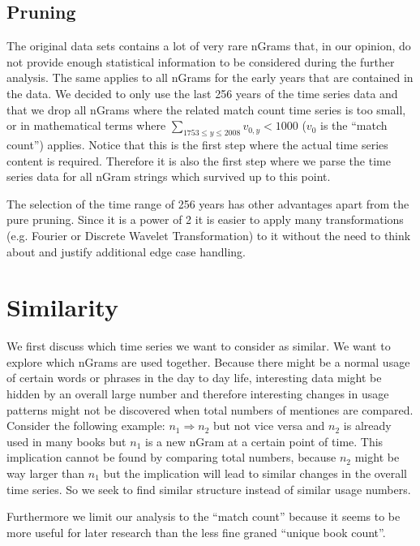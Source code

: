 \subsection{Pruning}
\label{ssec:baseline:data:prune}
The original data sets contains a lot of very rare nGrams that, in our opinion, do not provide enough statistical information to be considered during the further analysis. The same applies to all nGrams for the early years that are contained in the data. We decided to only use the last \num{256} years of the time series data and that we drop all nGrams where the related match count time series is too small, or in mathematical terms where $\sum_{1753 \leq y \leq 2008} v_{0, y} < 1000$ ($v_0$ is the \enquote{match count}) applies. Notice that this is the first step where the actual time series content is required. Therefore it is also the first step where we parse the time series data for all nGram strings which survived up to this point.

The selection of the time range of \num{256} years has other advantages apart from the pure pruning. Since it is a power of \num{2} it is easier to apply many transformations (e.g. Fourier or Discrete Wavelet Transformation) to it without the need to think about and justify additional edge case handling.



\section{Similarity}
\label{sec:baseline:sim}
We first discuss which time series we want to consider as similar. We want to explore which nGrams are used together. Because there might be a normal usage of certain words or phrases in the day to day life, interesting data might be hidden by an overall large number and therefore interesting changes in usage patterns might not be discovered when total numbers of mentiones are compared. Consider the following example: $n_1 \Rightarrow n_2$ but not vice versa and $n_2$ is already used in many books but $n_1$ is a new nGram at a certain point of time. This implication cannot be found by comparing total numbers, because $n_2$ might be way larger than $n_1$ but the implication will lead to similar changes in the overall time series. So we seek to find similar structure instead of similar usage numbers.

Furthermore we limit our analysis to the \enquote{match count} because it seems to be more useful for later research than the less fine graned \enquote{unique book count}.


